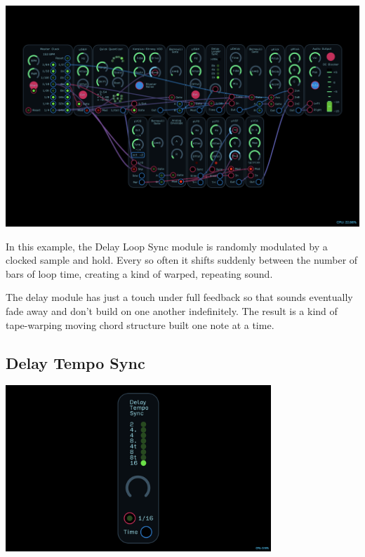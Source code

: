 \documentclass[11pt]{book}
\begin{document}
\begin{multicols*}{2}
\begin{center}
\includegraphics[width=0.95\linewidth]{delay-looper-sync-fig2.png}
\end{center}

In this example, the Delay Loop Sync module is randomly modulated by a clocked sample and hold. Every so often it shifts suddenly between the number of bars of loop time, creating a kind of warped, repeating sound.

The delay module has just a touch under full feedback so that sounds eventually fade away and don't build on one another indefinitely. The result is a kind of tape-warping moving chord structure built one note at a time.

\end{multicols*}

\pagebreak


\subsection{Delay Tempo Sync}

\begin{center}
\includegraphics[width=0.75\textwidth]{delay-tempo-sync.png}
\end{center}
\end{document}
